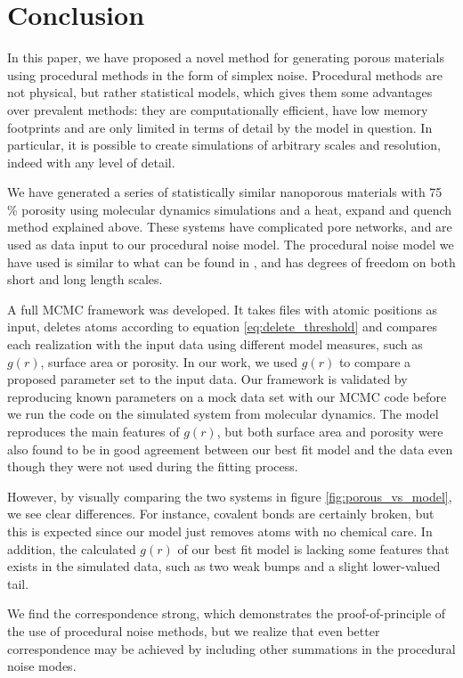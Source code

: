 \documentclass[aps,pre,twocolumn,letterpaper,floatfix,showpacs]{revtex4}
\begin{document}
\section{Conclusion}
In this paper, we have proposed a novel method for generating porous materials using procedural methods in the form of simplex noise.
Procedural methods are not physical, but rather statistical models, which gives them some advantages over prevalent methods: they are computationally efficient, have low memory footprints and are only limited in terms of detail by the model in question. 
In particular, it is possible to create simulations of arbitrary scales and resolution, indeed with any level of detail. 

We have generated a series of statistically similar nanoporous materials with 75 \% porosity using molecular dynamics simulations and a heat, expand and quench method explained above.
These systems have complicated pore networks, and are used as data input to our procedural noise model.
The procedural noise model we have used is similar to what can be found in \cite{groeneboom:2014}, and has degrees of freedom on both short and long length scales.

A full MCMC framework was developed. It takes files with atomic positions as input, deletes atoms according to equation \eqref{eq:delete_threshold} and compares each realization with the input data using different model measures, such as $g(r)$, surface area or porosity.
In our work, we used $g(r)$ to compare a proposed parameter set to the input data.
Our framework is validated by reproducing known parameters on a mock data set with our MCMC code before we run the code on the simulated system from molecular dynamics.
The model reproduces the main features of $g(r)$, but both surface area and porosity were also found to be in good agreement between our best fit model and the data even though they were not used during the fitting process.

However, by visually comparing the two systems in figure \ref{fig:porous_vs_model}, we see clear differences. For instance, covalent bonds are certainly broken, but this is expected since our model just removes atoms with no chemical care.
In addition, the calculated $g(r)$ of our best fit model is lacking some features that exists in the simulated data, such as two weak bumps and a slight lower-valued tail.

We find the correspondence strong, which demonstrates the proof-of-principle of the use of
procedural noise methods, but we realize that even better correspondence may be achieved by including other summations in the procedural noise modes.
\end{document}
